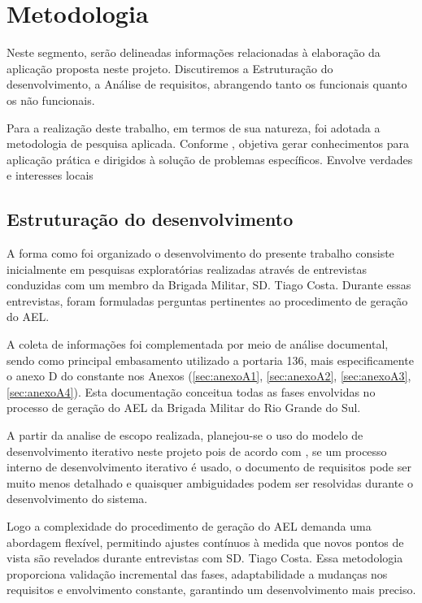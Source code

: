 \chapter{Metodologia}
Neste segmento, serão delineadas informações relacionadas à elaboração da aplicação proposta neste projeto. Discutiremos a Estruturação do desenvolvimento, a Análise de requisitos, abrangendo tanto os funcionais quanto os não funcionais.

Para a realização deste trabalho, em termos de sua natureza, foi adotada a metodologia de pesquisa aplicada. Conforme \cite{da2005metodologia}, objetiva gerar conhecimentos para aplicação prática e dirigidos à solução de problemas específicos. Envolve verdades e interesses locais

\section{Estruturação do desenvolvimento}\label{sec:estruturacao-desenvolvimento}
A forma como foi organizado o desenvolvimento do presente trabalho consiste inicialmente em pesquisas exploratórias realizadas através de entrevistas conduzidas com um membro da Brigada Militar, SD. Tiago Costa. Durante essas entrevistas, foram formuladas perguntas pertinentes ao procedimento de geração do AEL.

A coleta de informações foi complementada por meio de análise documental, sendo como principal embasamento utilizado a portaria 136, mais especificamente o anexo D do \cite{ExércitoBrasileiro} constante nos Anexos (\ref{sec:anexoA1}, \ref{sec:anexoA2}, \ref{sec:anexoA3}, \ref{sec:anexoA4}). Esta documentação conceitua todas as fases envolvidas no processo de geração do AEL da Brigada Militar do Rio Grande do Sul.

A partir da analise de escopo realizada, planejou-se o uso do modelo de desenvolvimento iterativo neste projeto pois de acordo com \cite{engenhariasw}, se um processo interno de desenvolvimento iterativo é usado, o documento de requisitos pode ser muito menos detalhado e quaisquer ambiguidades podem ser resolvidas durante o desenvolvimento do sistema.

Logo a complexidade do procedimento de geração do AEL demanda uma abordagem flexível, permitindo ajustes contínuos à medida que novos pontos de vista são revelados durante entrevistas com SD. Tiago Costa. Essa metodologia proporciona validação incremental das fases, adaptabilidade a mudanças nos requisitos e envolvimento constante, garantindo um desenvolvimento mais preciso.


